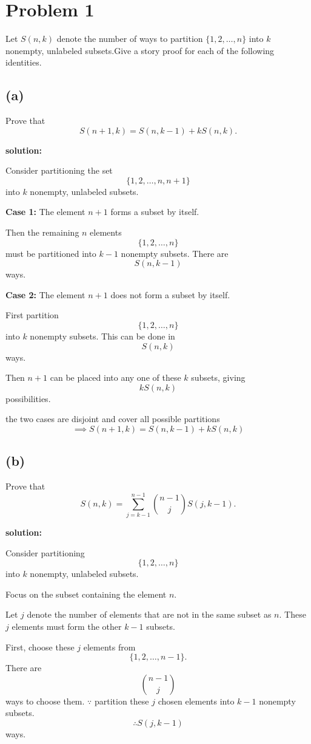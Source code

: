 \documentclass{article}
\begin{document}
\section*{Problem 1}

Let $S(n,k)$ denote the number of ways to partition
$\{1,2,\ldots,n\}$ into $k$ nonempty, unlabeled subsets.Give a story proof for each of the following identities.


\subsection*{(a)}

Prove that
\[
S(n+1,k)=S(n,k-1)+kS(n,k).
\]

\textbf{solution:}

Consider partitioning the set
\[
\{1,2,\ldots,n,n+1\}
\]
into $k$ nonempty, unlabeled subsets.

\textbf{Case 1:} The element $n+1$ forms a subset by itself.

Then the remaining $n$ elements
\[
\{1,2,\ldots,n\}
\]
must be partitioned into $k-1$ nonempty subsets. There are
\[
S(n,k-1)
\]
ways.

\textbf{Case 2:} The element $n+1$ does not form a subset by itself.

First partition
\[
\{1,2,\ldots,n\}
\]
into $k$ nonempty subsets. This can be done in
\[
S(n,k)
\]
ways.

Then $n+1$ can be placed into any one of these $k$ subsets, giving
\[
kS(n,k)
\]
possibilities.

the two cases are disjoint and cover all possible partitions
\[
\implies
S(n+1,k)=S(n,k-1)+kS(n,k)
\]
\subsection*{(b)}

Prove that
\[
S(n,k)
=
\sum_{j=k-1}^{n-1}
\binom{n-1}{j}
S(j,k-1).
\]

\textbf{solution:}

Consider partitioning
\[
\{1,2,\ldots,n\}
\]
into $k$ nonempty, unlabeled subsets.

Focus on the subset containing the element $n$.

Let $j$ denote the number of elements that are not in the same subset as $n$.
These $j$ elements must form the other $k-1$ subsets.

First, choose these $j$ elements from
\[
\{1,2,\ldots,n-1\}.
\]
There are
\[
\binom{n-1}{j}
\]
ways to choose them.
$\because$  partition these $j$ chosen elements into $k-1$ nonempty subsets.
\[
\therefore
S(j,k-1)
\]
ways.
\end{document}
